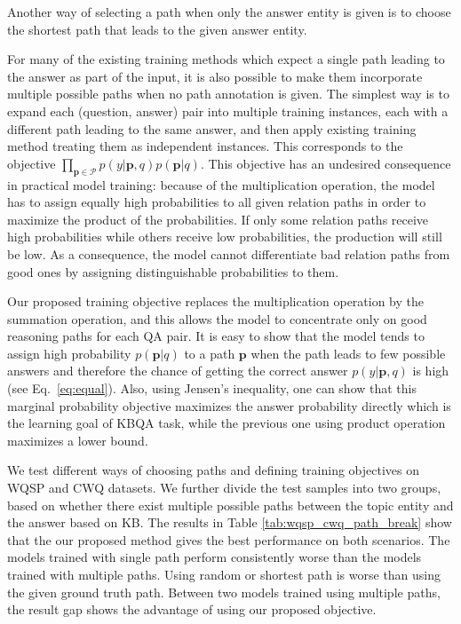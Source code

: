 Another way of selecting a path when only the answer entity is given is to choose the shortest path that leads to the given answer entity.

For many of the existing training methods which expect a single path leading to the answer as part of the input, it is also possible to make them incorporate multiple possible paths when no path annotation is given. The simplest way is to expand each (question, answer) pair into multiple training instances, each with a different path leading to the same answer, and then apply existing training method treating them as independent instances. This corresponds to the objective $\prod_{\mathbf{p}\in\mathcal{P}} p(y|\mathbf{p},q)p(\mathbf{p}|q)$.
This objective has an undesired consequence in practical model training: because of the multiplication operation, the model has to assign equally high probabilities to all given relation paths in order to maximize the product of the probabilities. If only some relation paths receive high probabilities while others receive low probabilities, the production will still be low. As a consequence, the model cannot differentiate bad relation paths from good ones by assigning distinguishable probabilities to them.
 
 
Our proposed training objective replaces the multiplication operation by the summation operation, and this allows the model to concentrate only on good reasoning paths for each QA pair. It is easy to show that the model tends to assign high probability $p(\mathbf{p}|q)$ to a path $\mathbf{p}$ when the path leads to few possible answers and therefore the chance of getting the correct answer $p(y|\mathbf{p},q)$ is high (see Eq.~\ref{eq:equal}). Also, using Jensen's inequality, one can show that this marginal probability objective maximizes the answer probability directly which is the learning goal of KBQA task, while the previous one using product operation maximizes a lower bound. %


We test different ways of choosing paths and defining training objectives on WQSP and CWQ datasets. We further divide the test samples into two groups, based on whether there exist multiple possible paths between the topic entity and the answer based on KB. The results in Table \ref{tab:wqsp_cwq_path_break} show that the our proposed method gives the best performance on both scenarios. The models trained with single path perform consistently worse than the models trained with multiple paths. Using random or shortest path is worse than using the given ground truth path. Between two models trained using multiple paths, the result gap shows the advantage of using our proposed objective.



